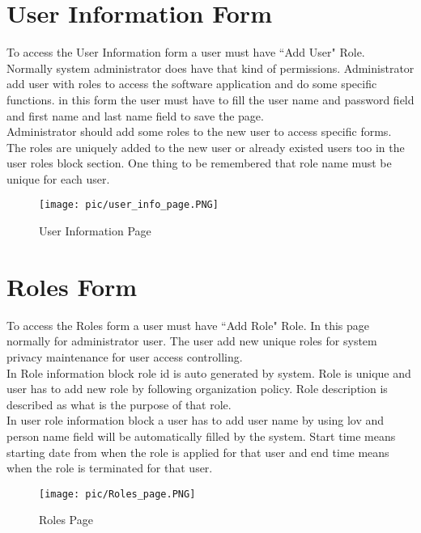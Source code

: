 \documentclass[12pt]{report} %
\begin{document}
\restoregeometry





\section{User Information Form}
To access the User Information form a user must have ``Add User" Role. Normally system administrator does have that kind of permissions. Administrator add user with roles to access the software application and do some specific functions. in this form the user must have to fill the user name and password field and first name and last name field to save the page.\\
Administrator should add some roles to the new user to access specific forms. The roles are uniquely added to the new user or already existed users too in the user roles block section. One thing to be remembered that role name must be unique for each user. %
\begin{figure}[h]
	\begin{center}
		\texttt{[image: pic/user\_info\_page.PNG]}
	\end{center}
	\caption{User Information Page}
	\label{fig:user_info_page}
\end{figure}

\clearpage




\section{Roles Form}
To access the Roles form a user must have ``Add Role" Role. In this page normally for administrator user. The user add new unique roles for system privacy maintenance for user access controlling.\\
In Role information block role id is auto generated by system. Role is unique and user has to add new role by following organization policy. Role description is described as what is the purpose of that role.\\
In user role information block a user has to add user name by using lov and person name field will be automatically filled by the system. Start time means starting date from when the role is applied for that user and end time means when the role is terminated for that user. 
\begin{figure}[h]
	\begin{center}
	\texttt{[image: pic/Roles\_page.PNG]}
	\end{center}
	\caption{Roles Page}
	\label{fig:Roles_page}
\end{figure}
\clearpage
\end{document}
